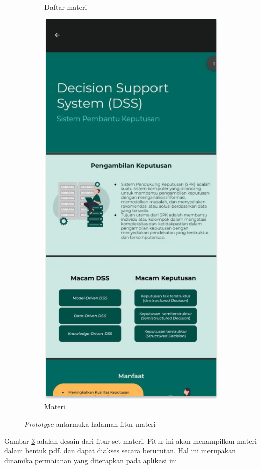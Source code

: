 \begin{figure}[H]
\begin{subfigure}[b]{0.23\textwidth}
	  \caption{Daftar materi}
	  \label{fig:HasilMain4-dark}
	\end{subfigure}
    \begin{subfigure}[b]{0.23\textwidth}
		\centering
	  \includegraphics[width=\linewidth]{contents/chapter-3/images/HF-materi2-dt.png}
	  \caption{Materi}
	  \label{fig:HasilMain4}
	\end{subfigure}
	\caption{\textit{Prototype} antarmuka halaman fitur materi}
	\label{Fig:HasilFeatureSetDrawer}
\end{figure}
Gambar \ref*{Fig:HasilFeatureSetDrawer} adalah desain dari fitur set materi.
Fitur ini akan menampilkan materi dalam bentuk pdf. dan dapat diakses secara berurutan.
Hal ini merupakan dinamika permaianan yang diterapkan pada aplikasi ini.
